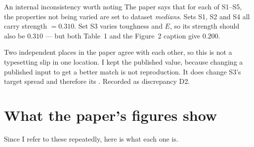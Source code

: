 \begin{warnbox}{An internal inconsistency worth noting}
The paper says that for each of S1--S5, the properties not being varied are set
to dataset \emph{medians}. Sets S1, S2 and S4 all carry strength $= 0.310$. Set
S3 varies toughness and $E$, so its strength should also be $0.310$ --- but both
Table~1 and the Figure~2 caption give $\mathbf{0.200}$.

Two independent places in the paper agree with each other, so this is not a
typesetting slip in one location. I kept the published value, because changing
a published input to get a better match is not reproduction. It does change
S3's target spread and therefore its \Rsq{}. Recorded as discrepancy D2.
\end{warnbox}

\section{What the paper's figures show}

Since I refer to these repeatedly, here is what each one is.

